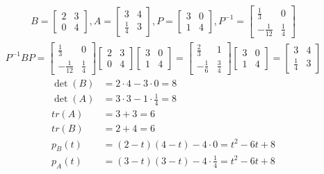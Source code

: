 \begin{example}
    \begin{align*}
        B = \begin{bmatrix}
            2 & 3 \\ 0 & 4
        \end{bmatrix}, A = \begin{bmatrix}
            3 & 4 \\ \frac{1}{4} & 3
        \end{bmatrix}, P = \begin{bmatrix}
            3 & 0 \\ 1 & 4
        \end{bmatrix}, P^{-1} = \begin{bmatrix}
            \frac{1}{3} & 0 \\ -\frac{1}{12} & \frac{1}{4}
        \end{bmatrix}
    \end{align*}
    \begin{align*}
        P^{-1}BP = \begin{bmatrix}
            \frac{1}{3} & 0 \\ -\frac{1}{12} & \frac{1}{4}
        \end{bmatrix}
        \begin{bmatrix}
            2 & 3 \\ 0 & 4
        \end{bmatrix}
        \begin{bmatrix}
            3 & 0 \\ 1 & 4
        \end{bmatrix} = \begin{bmatrix}
            \frac{2}{3} & 1 \\ -\frac{1}{6} & \frac{3}{4}
        \end{bmatrix}\begin{bmatrix}
            3 & 0 \\ 1 & 4
        \end{bmatrix} = \begin{bmatrix}
            3 & 4 \\ \frac{1}{4} & 3
        \end{bmatrix}
    \end{align*}
    \begin{align*}
        \det(B) & = 2 \cdot 4 - 3 \cdot 0 = 8                           \\
        \det(A) & = 3 \cdot 3 - 1 \cdot \frac{1}{4} = 8                 \\
        tr(A)   & = 3 + 3 = 6                                           \\
        tr(B)   & = 2 +4 = 6                                            \\
        p_B(t)  & = (2 - t)(4 - t) - 4 \cdot 0 = t^2 - 6t + 8           \\
        p_A(t)  & = (3 - t)(3 - t) - 4 \cdot \frac{1}{4} = t^2 - 6t + 8 \\
    \end{align*}
\end{example}
